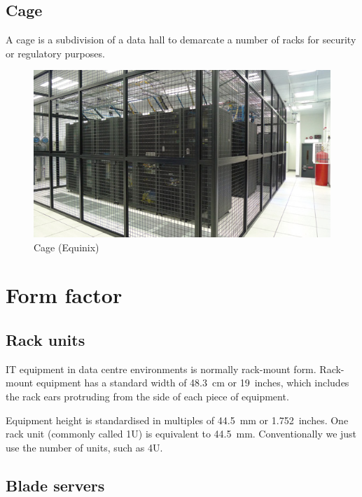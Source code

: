 \documentclass{pgnotes}
\begin{document}
\subsection{Cage}

A cage is a subdivision of a data hall to demarcate a number of racks for security or regulatory purposes.

\begin{figure}[htbp]
  \centering
  \includegraphics[width=1.0\linewidth]{cage}
  \caption{Cage (Equinix)}
  \label{fig:cage}
\end{figure}


\section{Form factor}

\subsection{Rack units}

IT equipment in data centre environments is normally rack-mount form.
Rack-mount equipment has a standard width of \SI{48.3}{\centi\metre} or 19~inches, which includes the rack ears protruding from the side of each piece of equipment.

Equipment height is standardised in multiples of \SI{44.5}{\milli\metre} or 1.752~inches.
One rack unit (commonly called 1U) is equivalent to \SI{44.5}{\milli\metre}.
Conventionally we just use the number of units, such as 4U.

\subsection{Blade servers}
\end{document}
